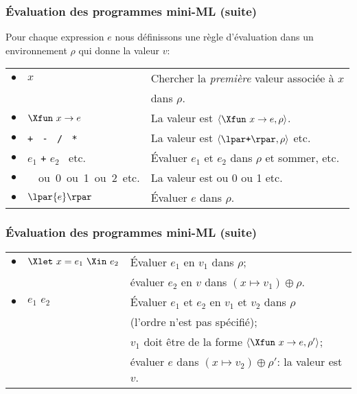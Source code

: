 %
\begin{frame}
\frametitle{Évaluation des programmes mini-ML (suite)}

Pour chaque expression $e$ nous définissons une règle d'évaluation
dans un environnement $\rho$ qui donne la valeur $v$:

\begin{tabular}{rll}
    $\bullet$
  & $x$ 
  & Chercher la \emph{première} valeur associée à $x$\\
 && dans $\rho$.\\
    $\bullet$
  & $\Xfun \,\, x \rightarrow e$
  & La valeur est $\langle\Xfun \,\, x \rightarrow e, \rho\rangle$.\\
    $\bullet$
  & \texttt{+} \ \texttt{-} \ \texttt{/} \ \texttt{*}
  & La valeur est $\langle\lpar\texttt{+}\rpar, \rho\rangle$ etc.\\
    $\bullet$
  & $e_1$ \texttt{+} $e_2$ \ etc.
  & Évaluer $e_1$ et $e_2$ dans $\rho$ et sommer, etc.\\
    $\bullet$
  & \unit \ ou \textsf{0} ou \textsf{1} ou \textsf{2} etc.
  & La valeur est \unit{} ou \textsf{0} ou \textsf{1} etc.\\
    $\bullet$
  & $\lpar{e}\rpar$
  & Évaluer $e$ dans $\rho$.
\end{tabular}

\end{frame}

%
\begin{frame}
\frametitle{Évaluation des programmes mini-ML (suite)}
\label{semantique_let_in}

\begin{tabular}{rll}
    $\bullet$
  & $\Xlet \,\, x = e_1 \,\, \Xin \,\, e_2$
  & Évaluer $e_1$ en $v_1$ dans $\rho$;\\
  & 
  & évaluer $e_2$ en $v$ dans $(x \mapsto v_1) \oplus \rho$.\\
    $\bullet$
  & $e_1 \,\, e_2$
  & Évaluer $e_1$ et $e_2$ en $v_1$ et $v_2$ dans $\rho$\\
  &
  & (l'ordre n'est pas spécifié);\\
  &
  & $v_1$ doit être de la forme $\langle\Xfun \,\, x \rightarrow
    e,\rho'\rangle$;\\
  &
  & évaluer $e$ dans $(x \mapsto v_2) \oplus \rho'$: la valeur est $v$.
\end{tabular}

\end{frame}

